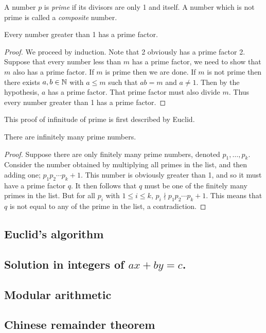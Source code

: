 \documentclass[main.tex]{subfiles}
\begin{document}
			\begin{definition}
				A number $p$ is \textit{prime} if its divisors are only 1 and itself. A number which is not prime is called a \textit{composite} number.
			\end{definition}
			\begin{theorem}
				Every number greater than 1 has a prime factor.
			\end{theorem}
			\begin{proof}
				We proceed by induction. Note that 2 obviously has a prime factor 2. Suppose that every number less than $m$ has a prime factor, we need to show that $m$ also has a prime factor. If $m$ is prime then we are done. If $m$ is not prime then there exists $a, b \in\mathbb N$ with $a \leq m$ such that $ab = m$ and $a \neq 1$. Then by the hypothesis, $a$ has a prime factor. That prime factor must also divide $m$. Thus every number greater than 1 has a prime factor.
			\end{proof}
			This proof of infinitude of prime is first described by Euclid.
			\begin{theorem}
				There are infinitely many prime numbers.
			\end{theorem}
			\begin{proof}
				Suppose there are only finitely many prime numbers, denoted $p_1,\ldots, p_k$. Consider the number obtained by multiplying all primes in the list, and then adding one; $p_1p_2\cdots p_k + 1$. This number is obviously greater than 1, and so it must have a prime factor $q$. It then follows that $q$ must be one of the finitely many primes in the list. But for all $p_i$ with $1 \leq i \leq k$, $p_i \nmid p_1p_2\cdots p_k + 1$. This means that $q$ is not equal to any of the prime in the list, a contradiction. 
			\end{proof}
		\subsection{Euclid's algorithm}
		
		\subsection{Solution in integers of $ax + by = c$.}
		
		\subsection{Modular arithmetic}
		
		\subsection{Chinese remainder theorem}
		
\end{document}
